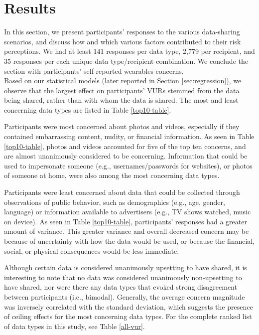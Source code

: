 \documentclass{sig-alternate-hotpets15}
\begin{document}
\section{Results}
In this section, we present participants' responses to the various data-sharing scenarios, and discuss how and which various factors contributed to their risk perceptions. We had at least 141 responses per data type, 2,779 per recipient, and 35 responses per each unique data type/recipient combination. We conclude the section with participants' self-reported wearables concerns.\\

Based on our statistical models (later reported in Section \ref{sec:regression}), we observe that the largest effect on participants' VURs stemmed from the data being shared, rather than  with whom the data is shared. The most and least concerning data types are listed in Table \ref{top10-table}. 

Participants were most concerned about photos and videos, especially if they contained embarrassing content, nudity, or financial information. As seen in Table \ref{top10-table}, photos and videos accounted for five of the top ten concerns, and are almost unanimously considered to be concerning. Information that could be used to impersonate someone (e.g., usernames/passwords for websites), or photos of someone at home, were also among the most concerning data types. 

Participants were least concerned about data that could be collected through observations of public behavior, such as demographics (e.g., age, gender, language) or information available to advertisers (e.g., TV shows watched, music on device). As seen in Table \ref{top10-table}, participants' responses had a greater amount of variance.  This greater variance and overall decreased concern may be because of uncertainty with how the data would be used, or because the financial, social, or physical consequences would be less immediate.

Although certain data is considered unanimously upsetting to have shared, it is interesting to note that no data was considered unanimously non-upsetting to have shared, nor were there any data types that evoked strong disagreement between participants (i.e., bimodal). Generally, the average concern magnitude was inversely correlated with the standard deviation, which suggests the presence of ceiling effects for the most concerning data types. For the complete ranked list of data types in this study, see Table \ref{all-vur}.\\
\end{document}
